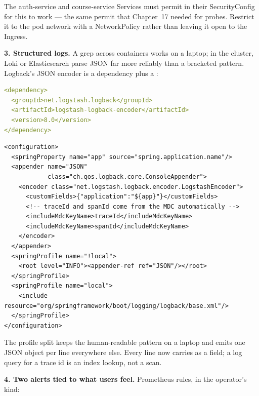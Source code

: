 The auth-service and course-service Services must permit
 in their SecurityConfig for this to work
--- the same permit that Chapter~17 needed for probes. Restrict it to
the pod network with a NetworkPolicy rather than leaving it open to the
Ingress.

\textbf{3. Structured logs.} A grep across containers works on a
laptop; in the cluster, Loki or Elasticsearch parse JSON far more
reliably than a bracketed pattern. Logback's JSON encoder is a
dependency plus a :

\begin{lstlisting}[language=yaml]
<dependency>
  <groupId>net.logstash.logback</groupId>
  <artifactId>logstash-logback-encoder</artifactId>
  <version>8.0</version>
</dependency>
\end{lstlisting}

\begin{lstlisting}
<configuration>
  <springProperty name="app" source="spring.application.name"/>
  <appender name="JSON"
            class="ch.qos.logback.core.ConsoleAppender">
    <encoder class="net.logstash.logback.encoder.LogstashEncoder">
      <customFields>{"application":"${app}"}</customFields>
      <!-- traceId and spanId come from the MDC automatically -->
      <includeMdcKeyName>traceId</includeMdcKeyName>
      <includeMdcKeyName>spanId</includeMdcKeyName>
    </encoder>
  </appender>
  <springProfile name="!local">
    <root level="INFO"><appender-ref ref="JSON"/></root>
  </springProfile>
  <springProfile name="local">
    <include resource="org/springframework/boot/logging/logback/base.xml"/>
  </springProfile>
</configuration>
\end{lstlisting}

The profile split keeps the human-readable pattern on a laptop and emits
one JSON object per line everywhere else. Every line now carries
 as a field; a log query for a trace id is an index
lookup, not a scan.

\textbf{4. Two alerts tied to what users feel.} Prometheus rules, in
the operator's  kind:

